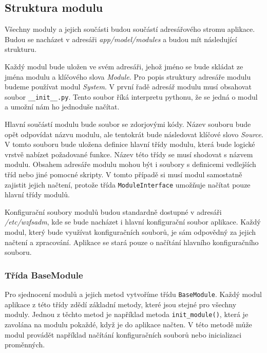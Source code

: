     \subsection{Struktura modulu}
    \label{package}
    Všechny moduly a jejich součásti budou součástí adresářového stromu aplikace. Budou se nacházet v adresáři \emph{app/model/modules} a budou mít následující strukturu.
    \begin{figure}
      \centering
    \end{figure}

    Každý modul bude uložen ve svém adresáři, jehož jméno se bude skládat ze jména modulu a klíčového slova \emph{Module}. Pro popis struktury adresáře modulu budeme používat modul \emph{System}. V první řadě adresář modulu musí obsahovat soubor \verb|__init__.py|. Tento soubor říká interpretu pythonu, že se jedná o modul a umožní nám ho jednoduše načítat.

    Hlavní součástí modulu bude soubor se zdorjovými kódy. Název souboru bude opět odpovídat názvu modulu, ale tentokrát bude následovat klíčové slovo \emph{Source}.
    V tomto souboru bude uložena definice hlavní třídy modulu, která bude logické vrstvě nabízet požadované funkce. Název této třídy se musí shodovat s názvem modulu. Obsahem adresáře modulu mohou být i soubory s definicemi vedlejších tříd nebo jiné pomocné skripty. V tomto případě si musí modul samostatně zajistit jejich načtení, protože třída \verb|ModuleInterface| umožňuje načítat pouze hlavní třídy modulů.

    Konfigurační soubory modulů budou standardně dostupné v adresáři \emph{/etc/wzfsadm}, kde se bude nacházet i hlavní konfigurační soubor aplikace. Každý modul, který bude využívat konfiguračních souborů, je sám odpovědný za jejich načtení a zpracování. Aplikace se stará pouze o načítání hlavního konfiguračního souboru.

    \subsubsection{Třída BaseModule}
    Pro sjednocení modulů a jejich metod vytvoříme třídu \verb|BaseModule|. Každý modul aplikace z této třídy zdědí základní metody, které jsou stejné pro všechny moduly.
    Jednou z těchto metod je například metoda \verb|init_module()|, která je zavolána na modulu pokaždé, když je do aplikace načten. V této metodě může modul provádět například načítání konfiguračních souborů nebo inicializaci proměnných.

